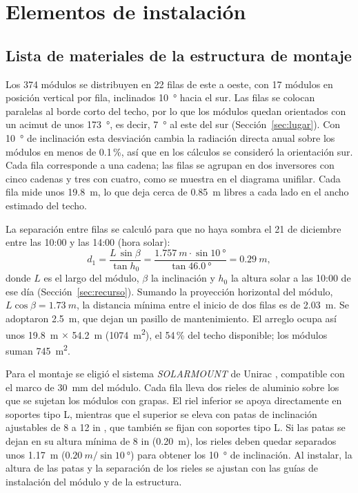 \FloatBarrier
\section{Elementos de instalación}\label{sec:instalacion}

\subsection{Lista de materiales de la estructura de montaje}

Los 374 módulos se distribuyen en 22 filas de este a oeste, con 17 módulos en posición vertical por fila, inclinados \SI{10}{\degree} hacia el sur. Las filas se colocan paralelas al borde corto del techo, por lo que los módulos quedan orientados con un acimut de unos \SI{173}{\degree}, es decir, \SI{7}{\degree} al este del sur (Sección~\ref{sec:lugar}). Con \SI{10}{\degree} de inclinación esta desviación cambia la radiación directa anual sobre los módulos en menos de 0.1\,\%, así que en los cálculos se consideró la orientación sur. Cada fila corresponde a una cadena; las filas se agrupan en dos inversores con cinco cadenas y tres con cuatro, como se muestra en el diagrama unifilar. Cada fila mide unos \SI{19.8}{m}, lo que deja cerca de \SI{0.85}{m} libres a cada lado en el ancho estimado del techo.

La separación entre filas se calculó para que no haya sombra el 21 de diciembre entre las 10:00 y las 14:00 (hora solar):
\begin{equation}
d_1 = \frac{L\,\sin\beta}{\tan h_0} = \frac{\SI{1.757}{m}\cdot\sin\SI{10}{\degree}}{\tan\SI{46.0}{\degree}} = \SI{0.29}{m},
\end{equation}
donde $L$ es el largo del módulo, $\beta$ la inclinación y $h_0$ la altura solar a las 10:00 de ese día (Sección~\ref{sec:recurso}). Sumando la proyección horizontal del módulo, $L\cos\beta=\SI{1.73}{m}$, la distancia mínima entre el inicio de dos filas es de \SI{2.03}{m}. Se adoptaron \SI{2.5}{m}, que dejan un pasillo de mantenimiento. El arreglo ocupa así unos \SI{19.8}{m} $\times$ \SI{54.2}{m} (\SI{1074}{m^2}), el 54\,\% del techo disponible; los módulos suman \SI{745}{m^2}.

Para el montaje se eligió el sistema \textit{SOLARMOUNT} de Unirac \cite{unirac_design}, compatible con el marco de \SI{30}{mm} del módulo. Cada fila lleva dos rieles de aluminio sobre los que se sujetan los módulos con grapas. El riel inferior se apoya directamente en soportes tipo L, mientras que el superior se eleva con patas de inclinación ajustables de 8 a 12 in \cite{unirac_tilt}, que también se fijan con soportes tipo L. Si las patas se dejan en su altura mínima de 8 in (\SI{0.20}{m}), los rieles deben quedar separados unos \SI{1.17}{m} ($\SI{0.20}{m}/\sin\SI{10}{\degree}$) para obtener los \SI{10}{\degree} de inclinación. Al instalar, la altura de las patas y la separación de los rieles se ajustan con las guías de instalación del módulo y de la estructura.

